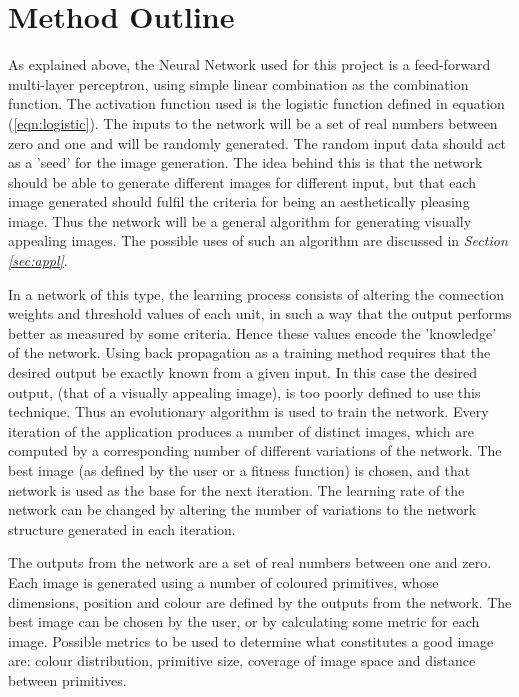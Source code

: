 \documentclass{acm_proc_article-sp}
\begin{document}
\section{Method Outline}
\label{sec:method}

As explained above, the Neural Network used for this project is a feed-forward multi-layer perceptron, using simple linear combination as the combination function. The activation function used is the logistic function defined in equation (\ref{eqn:logistic}). The inputs to the network will be a set of real numbers between zero and one and will be randomly generated. The random input data should act as a 'seed' for the image generation. The idea behind this is that the network should be able to generate different images for different input, but that each image generated should fulfil the criteria for being an aesthetically pleasing image. Thus the network will be a general algorithm for generating visually appealing images. The possible uses of such an algorithm are discussed in \textit{Section \ref{sec:appl}}. 

\vspace{3mm} 

In a network of this type, the learning process consists of altering the connection weights and threshold values of each unit, in such a way that the output performs better as measured by some criteria. Hence these values encode the 'knowledge' of the network. Using back propagation as a training method requires that the desired output be exactly known from a given input. In this case the desired output, (that of a visually appealing image), is too poorly defined to use this technique. Thus an evolutionary algorithm is used to train the network. Every iteration of the application produces a number of distinct images, which are computed by a corresponding number of different variations of the network. The best image (as defined by the user or a fitness function) is chosen, and that network is used as the base for the next iteration. The learning rate of the network can be changed by altering the number of variations to the network structure generated in each iteration.

\vspace{3mm}

The outputs from the network are a set of real numbers between one and zero. Each image is generated using a number of coloured primitives, whose dimensions, position and colour are defined by the outputs from the network. The best image can be chosen by the user, or by calculating some metric for each image. Possible metrics to be used to determine what constitutes a good image are: colour distribution, primitive size, coverage of image space and distance between primitives. 
\end{document}
